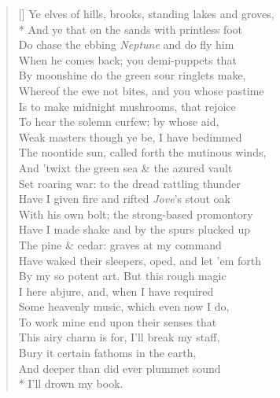 \documentclass[MAIN]{subfiles}
\begin{document}
\settowidth{\versewidth}{Ye elves of hills, brooks, standing lakes and groves,}
\begin{verse}[\versewidth]
Ye elves of hills, brooks, standing lakes and groves,\\*
And ye that on the sands with printless foot\\
Do chase the ebbing \emph{Neptune} and do fly him\\
When he comes back; you demi-puppets that\\
By moonshine do the green sour ringlets make,\\
Whereof the ewe not bites, and you whose pastime\\
Is to make midnight mushrooms, that rejoice\\
To hear the solemn curfew; by whose aid,\\
Weak masters though ye be, I have bedimmed\\
The noontide sun, called forth the mutinous winds,\\
And 'twixt the green sea \& the azured vault\\
Set roaring war: to the dread rattling thunder\\
Have I given fire and rifted \emph{Jove}'s stout oak\\
With his own bolt; the strong-based promontory\\
Have I made shake and by the spurs plucked up\\
The pine \& cedar: graves at my command\\
Have waked their sleepers, oped, and let 'em forth\\
By my so potent art. But this rough magic\\
I here abjure, and, when I have required\\
Some heavenly music, which even now I do,\\
To work mine end upon their senses that\\
This airy charm is for, I'll break my staff,\\
Bury it certain fathoms in the earth,\\
And deeper than did ever plummet sound\\*
I'll drown my book.
\end{verse}
\end{document}
